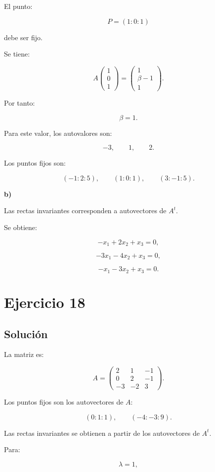 \documentclass[11pt,a4paper]{article}
\begin{document}
El punto:

\[
P=(1:0:1)
\]

debe ser fijo.

Se tiene:

\[
A
\begin{pmatrix}
1\\0\\1
\end{pmatrix}
=
\begin{pmatrix}
1\\
\beta-1\\
1
\end{pmatrix}.
\]

Por tanto:

\[
\boxed{
\beta=1.
}
\]

Para este valor, los autovalores son:

\[
-3,\qquad1,\qquad2.
\]

Los puntos fijos son:

\[
\boxed{
(-1:2:5),
\qquad
(1:0:1),
\qquad
(3:-1:5).
}
\]

\textbf{b)}

Las rectas invariantes corresponden a autovectores de \(A^t\).

Se obtiene:

\[
\boxed{
-x_1+2x_2+x_3=0,
}
\]

\[
\boxed{
-3x_1-4x_2+x_3=0,
}
\]

\[
\boxed{
-x_1-3x_2+x_3=0.
}
\]

\section{Ejercicio 18}
\subsection{Solución}

La matriz es:

\[
A=
\begin{pmatrix}
2&1&-1\\
0&2&-1\\
-3&-2&3
\end{pmatrix}.
\]

Los puntos fijos son los autovectores de \(A\):

\[
\boxed{
(0:1:1),
\qquad
(-4:-3:9).
}
\]

Las rectas invariantes se obtienen a partir de los autovectores de \(A^t\).

Para:

\[
\lambda=1,
\]
\end{document}
